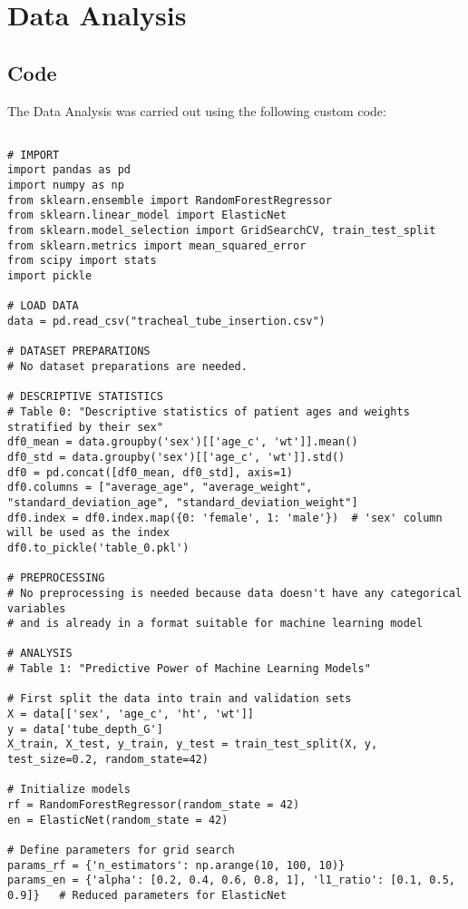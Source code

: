 \documentclass[11pt]{article}
\begin{document}
\section{Data Analysis}
\subsection{{Code}}
The Data Analysis was carried out using the following custom code:

\begin{verbatim}

# IMPORT
import pandas as pd
import numpy as np
from sklearn.ensemble import RandomForestRegressor
from sklearn.linear_model import ElasticNet
from sklearn.model_selection import GridSearchCV, train_test_split
from sklearn.metrics import mean_squared_error
from scipy import stats
import pickle

# LOAD DATA
data = pd.read_csv("tracheal_tube_insertion.csv")

# DATASET PREPARATIONS
# No dataset preparations are needed.

# DESCRIPTIVE STATISTICS
# Table 0: "Descriptive statistics of patient ages and weights stratified by their sex"
df0_mean = data.groupby('sex')[['age_c', 'wt']].mean()
df0_std = data.groupby('sex')[['age_c', 'wt']].std()
df0 = pd.concat([df0_mean, df0_std], axis=1)
df0.columns = ["average_age", "average_weight", "standard_deviation_age", "standard_deviation_weight"]
df0.index = df0.index.map({0: 'female', 1: 'male'})  # 'sex' column will be used as the index
df0.to_pickle('table_0.pkl') 

# PREPROCESSING
# No preprocessing is needed because data doesn't have any categorical variables
# and is already in a format suitable for machine learning model

# ANALYSIS 
# Table 1: "Predictive Power of Machine Learning Models"

# First split the data into train and validation sets
X = data[['sex', 'age_c', 'ht', 'wt']]
y = data['tube_depth_G']
X_train, X_test, y_train, y_test = train_test_split(X, y, test_size=0.2, random_state=42)

# Initialize models
rf = RandomForestRegressor(random_state = 42)
en = ElasticNet(random_state = 42)

# Define parameters for grid search
params_rf = {'n_estimators': np.arange(10, 100, 10)}
params_en = {'alpha': [0.2, 0.4, 0.6, 0.8, 1], 'l1_ratio': [0.1, 0.5, 0.9]}   # Reduced parameters for ElasticNet


\end{verbatim}
\end{document}
